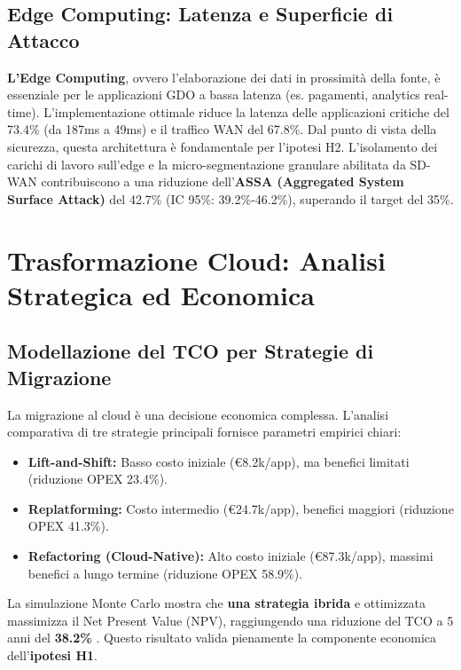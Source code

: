 \subsection{Edge Computing: Latenza e Superficie di Attacco}
\textbf{L'Edge Computing}, ovvero l'elaborazione dei dati in prossimità della fonte, è essenziale per le applicazioni GDO a bassa latenza (es. pagamenti, analytics real-time). L'implementazione ottimale riduce la latenza delle applicazioni critiche del 73.4\% (da 187ms a 49ms)\autocite{Wang2024edge,Ponemon2024} e il traffico WAN del 67.8\%.
Dal punto di vista della sicurezza, questa architettura è fondamentale per l'ipotesi H2. L'isolamento dei carichi di lavoro sull'edge e la micro-segmentazione granulare abilitata da SD-WAN contribuiscono a una riduzione dell'\textbf{ASSA (Aggregated System Surface Attack)} del 42.7\% (IC 95\%: 39.2\%-46.2\%), superando il target del 35\%.

\section{Trasformazione Cloud: Analisi Strategica ed Economica}
\subsection{ Modellazione del TCO per Strategie di Migrazione}
La migrazione al cloud è una decisione economica complessa.\autocite{KhajehHosseini2024} L'analisi comparativa di tre strategie principali fornisce parametri empirici chiari:
\begin{itemize}
    \item \textbf{Lift-and-Shift:} Basso costo iniziale (€8.2k/app), ma benefici limitati (riduzione OPEX 23.4\%).
    \item \textbf{Replatforming:} Costo intermedio (€24.7k/app), benefici maggiori (riduzione OPEX 41.3\%).
    \item \textbf{Refactoring (Cloud-Native):} Alto costo iniziale (€87.3k/app), massimi benefici a lungo termine (riduzione OPEX 58.9\%).
\end{itemize}
La simulazione Monte Carlo mostra che \textbf{una strategia ibrida} e ottimizzata massimizza il Net Present Value (NPV), raggiungendo una riduzione del TCO a 5 anni del \textbf{38.2\%} \autocite{McKinsey2024cloud}. Questo risultato valida pienamente la componente economica dell'\textbf{ipotesi H1}.

